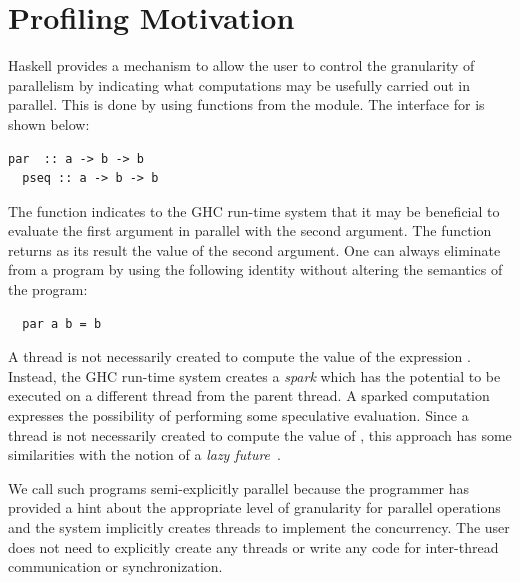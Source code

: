 \section{Profiling Motivation}
Haskell provides a mechanism to allow the user to control the granularity of parallelism by indicating what computations may be usefully carried out in parallel. This is done by using functions from the  module. The interface for  is shown below:
\begin{lstlisting}[columns=flexible]
  par  :: a -> b -> b 
  pseq :: a -> b -> b 
\end{lstlisting}
The function  indicates to the GHC run-time system that it may be beneficial to evaluate the first argument in parallel with the second argument. The  function returns as its result the value of the second argument. One can always eliminate  from a program by using the following identity without altering the semantics of the program:
\begin{lstlisting}
  par a b = b 
\end{lstlisting}
A thread is not necessarily created to compute the value of the expression . Instead, the GHC run-time system creates a {\em spark} which has the potential to be executed on a different thread from the parent thread. A sparked computation expresses the possibility of performing some speculative evaluation. Since a thread is not necessarily created to compute the value of , this approach has some similarities with the notion of a {\em lazy future}~\cite{mohr:91}.

%

We call such programs semi-explicitly parallel because the programmer has provided a hint about the appropriate level of granularity for parallel operations and the system implicitly creates threads to implement the concurrency. The user does not need to explicitly create any threads or write any code for inter-thread communication or synchronization.

